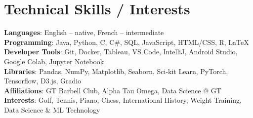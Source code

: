 \documentclass[letterpaper,11pt]{article}
\begin{document}
\section{Technical Skills / Interests}
 \begin{itemize}[leftmargin=0.15in, label={}]
    \small{\item{
     \textbf{Languages}{: English -- native, French -- intermediate} \\
     \textbf{Programming}{: Java, Python, C, C\#, SQL, JavaScript, HTML/CSS, R, LaTeX} \\
     \textbf{Developer Tools}{: Git, Docker, Tableau, VS Code, IntelliJ, Android Studio, Google Colab, Jupyter Notebook} \\
     \textbf{Libraries}{: Pandas, NumPy, Matplotlib, Seaborn, Sci-kit Learn, PyTorch, Tensorflow, D3.js, Gradio} \\
     \textbf{Affiliations}{: GT Barbell Club, Alpha Tau Omega, Data Science @ GT} \\
     \textbf{Interests}{: Golf, Tennis, Piano, Chess, International History, Weight Training, Data Science \& ML Technology}
    }}
 \end{itemize}


\end{document}
